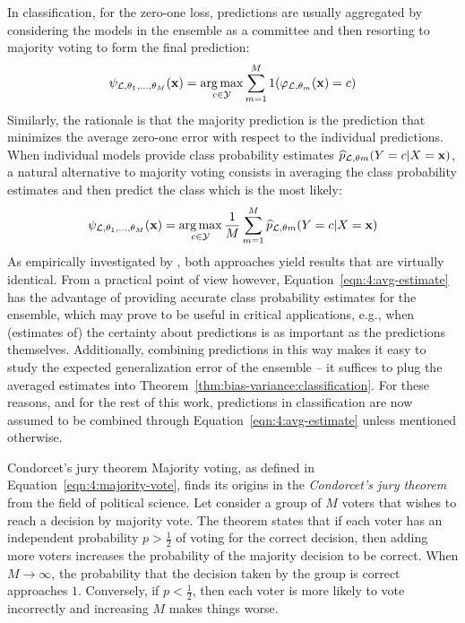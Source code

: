 In classification, for the zero-one loss, predictions are usually aggregated by considering the
models in the ensemble as a committee  and then resorting to majority voting to
form the final prediction:
\begin{equation}\label{eqn:4:majority-vote}
\psi_{{\cal L},\theta_1,\dots,\theta_M}(\mathbf{x}) = \operatorname*{arg\,max}_{c \in {\cal Y}}  \sum_{m=1}^M 1(\varphi_{{\cal L},\theta_m}(\mathbf{x})=c)
\end{equation}
Similarly, the rationale is that the majority prediction is the prediction that minimizes
the average zero-one error with respect to the individual predictions.
When individual models provide class probability estimates $\widehat{p}_{{\cal L},\theta m}(Y=c|X=\mathbf{x})$,
a natural alternative to majority voting consists in averaging the class probability estimates
and then predict the class which is the most likely:
\begin{equation}\label{eqn:4:avg-estimate}
\psi_{{\cal L},\theta_1,\dots,\theta_M}(\mathbf{x}) = \operatorname*{arg\,max}_{c \in {\cal Y}} \frac{1}{M} \sum_{m=1}^M \widehat{p}_{{\cal L},\theta m}(Y=c|X=\mathbf{x})
\end{equation}
As empirically investigated by \citet{breiman:1996b}, both approaches yield
results that are virtually identical. From a practical point of view however,
Equation~\ref{eqn:4:avg-estimate} has the advantage of providing accurate class
probability estimates for the ensemble, which may prove to be useful in
critical applications, e.g., when (estimates of) the certainty about
predictions is as important as the predictions themselves. Additionally,
combining predictions in this way makes it easy to study the expected
generalization error of the ensemble -- it suffices to plug the averaged
estimates into Theorem~\ref{thm:bias-variance:classification}. For these
reasons, and for the rest of this work, predictions in classification are now
assumed to be combined through Equation~\ref{eqn:4:avg-estimate} unless
mentioned otherwise.

\begin{remark}{Condorcet's jury theorem}
Majority voting, as defined in Equation~\ref{eqn:4:majority-vote},
finds its origins in the \textit{Condorcet's jury theorem}
from the field of political science. Let consider a group of $M$ voters that
wishes to reach a decision by majority vote. The theorem states that if each
voter has an independent  probability $p > \tfrac{1}{2}$ of voting for the
correct decision, then adding more voters increases the probability of
the majority decision to be correct. When $M \to \infty$, the probability that the decision
taken by the group is correct approaches $1$. Conversely, if $p < \tfrac{1}{2}$, then
each voter is more likely to vote incorrectly and increasing $M$ makes things
worse.
\end{remark}

